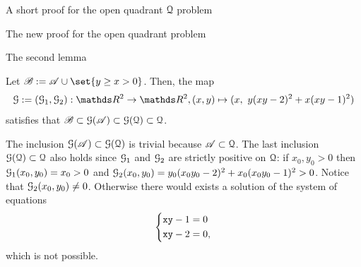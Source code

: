 \documentclass[11pt, a4paper, english, twoside, notitlepage, openright]{report}
\begin{document}
\begin{chapter}{A short proof for the open quadrant $\mathcal{Q}$ problem}
\begin{section}{The new proof for the open quadrant problem}
\begin{subsection}{The second lemma}
\begin{lemma}\label{lemma2}
Let $\mathscr{B}:=\mathscr{A}\cup\set{y\ge x>0}$. Then, the map
$$
\GG:=(\GG_1,\GG_2):\R^2\to\R^2,(x,y)\mapsto (x,\ y(xy-2)^2+x(xy-1)^2)
$$
satisfies that $\mathscr{B}\subset\mathcal{G}(\mathscr{A})\subset\mathcal{G}(\mathcal{Q})\subset\mathcal{Q}$.
\begin{Proof}
The inclusion $\mathcal{G}(\mathscr{A}) \subset \mathcal{G}(\mathcal{Q})$ is trivial because $\mathscr{A}\subset\mathcal{Q}$. The last inclusion $\mathcal{G}(\mathcal{Q}) \subset\mathcal{Q}$ also holds since $\mathcal{G}_1$ and $\mathcal{G}_2$ are strictly positive on $\mathcal{Q}$: if $x_0,y_0>0$ then $\mathcal{G}_1(x_0,y_0)=x_0> 0$ and $\mathcal{G}_2(x_0,y_0)=y_0(x_0y_0-2)^2+x_0(x_0y_0-1)^2>0$. Notice that $\mathcal{G}_2(x_0,y_0)\ne0$. Otherwise there would exists a solution of the system of equations
\begin{equation*}
\left\{
\begin{aligned}
&{\tt x}{\tt y}-1=0\\
&{\tt x}{\tt y}-2=0,\\
\end{aligned}
\right.
\end{equation*}
which is not possible.


\end{Proof}
\end{lemma}
\end{subsection}
\end{section}
\end{chapter}
\end{document}

